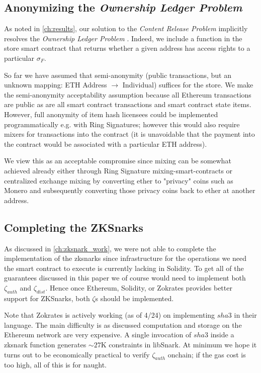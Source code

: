 \documentclass[12pt,oneside]{amsart}
\def\hash{sha3}
\def\zksnark{\zeta}
\def\crp{\textit{Content Release Problem} }
\def\olp{\textit{Ownership Ledger Problem} }
\begin{document}
\begin{multicols}{2}
\subsection{Anonymizing the \olp}

As noted in \ref{ch:results}, our solution to the \crp implicitly resolves the \olp.
Indeed, we include a function in the store smart contract that returns whether a given address has access rights to a particular $\sigma_F$.

So far we have assumed that semi-anonymity (public transactions, but an unknown mapping: ETH Address $\rightarrow$ Individual) suffices for the store.
We make the semi-anonymity acceptability assumption because all Ethereum transactions are public as are all smart contract transactions and smart contract state items.
However, full anonymity of item hash licensees could be implemented programmatically e.g. with Ring Signatures; however this would also require mixers for transactions into the contract (it is unavoidable that the payment into the contract would be associated with a particular ETH address).

We view this as an acceptable compromise since mixing can be somewhat achieved already either through Ring Signature mixing-smart-contracts or centralized exchange mixing by converting ether to "privacy" coins such as Monero and subsequently converting those privacy coins back to ether at another address.

\subsection{Completing the ZKSnarks}

As discussed in \ref{ch:zksnark_work}, we were not able to complete the implementation of the zksnarks since infrastructure for the operations we need the smart contract to execute is currently lacking in Solidity.
To get all of the guarantees discussed in this paper we of course would need to implement both $\zksnark_{auth}$ and $\zksnark_{dist}$.
Hence once Ethereum, Solidity, or Zokrates provides better support for ZKSnarks, both $\zksnark$s should be implemented.

Note that Zokrates is actively working (as of 4/24) on implementing $\hash$ in their language.
The main difficulty is as discussed computation and storage on the Ethereum network are very expensive.
A single invocation of $\hash$ inside a zksnark function generates $\sim 27$K constraints in libSnark.
At minimum we hope it turns out to be economically practical to verify $\zksnark_{auth}$ onchain; if the gas cost is too high, all of this is for naught.


\end{multicols}
\end{document}
